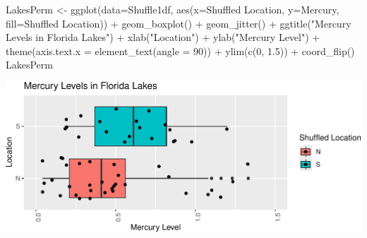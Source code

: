 \documentclass[
  letterpaper,
  DIV=11,
  numbers=noendperiod]{scrreprt}
\newenvironment{Shaded}{\begin{snugshade}}{\end{snugshade}}
\newcommand{\AttributeTok}[1]{\textcolor[rgb]{0.40,0.45,0.13}{#1}}
\newcommand{\DecValTok}[1]{\textcolor[rgb]{0.68,0.00,0.00}{#1}}
\newcommand{\FloatTok}[1]{\textcolor[rgb]{0.68,0.00,0.00}{#1}}
\newcommand{\FunctionTok}[1]{\textcolor[rgb]{0.28,0.35,0.67}{#1}}
\newcommand{\NormalTok}[1]{\textcolor[rgb]{0.00,0.23,0.31}{#1}}
\newcommand{\OtherTok}[1]{\textcolor[rgb]{0.00,0.23,0.31}{#1}}
\newcommand{\SpecialCharTok}[1]{\textcolor[rgb]{0.37,0.37,0.37}{#1}}
\newcommand{\StringTok}[1]{\textcolor[rgb]{0.13,0.47,0.30}{#1}}
\begin{document}
\begin{Shaded}
\end{Shaded}

\begin{Shaded}
\begin{Highlighting}[]
\NormalTok{LakesPerm }\OtherTok{\textless{}{-}} \FunctionTok{ggplot}\NormalTok{(}\AttributeTok{data=}\NormalTok{Shuffle1df, }\FunctionTok{aes}\NormalTok{(}\AttributeTok{x=}\StringTok{\textasciigrave{}}\AttributeTok{Shuffled Location}\StringTok{\textasciigrave{}}\NormalTok{, }\AttributeTok{y=}\NormalTok{Mercury, }\AttributeTok{fill=}\StringTok{\textasciigrave{}}\AttributeTok{Shuffled Location}\StringTok{\textasciigrave{}}\NormalTok{)) }\SpecialCharTok{+} 
  \FunctionTok{geom\_boxplot}\NormalTok{() }\SpecialCharTok{+}   \FunctionTok{geom\_jitter}\NormalTok{() }\SpecialCharTok{+} \FunctionTok{ggtitle}\NormalTok{(}\StringTok{"Mercury Levels in Florida Lakes"}\NormalTok{) }\SpecialCharTok{+} 
  \FunctionTok{xlab}\NormalTok{(}\StringTok{"Location"}\NormalTok{) }\SpecialCharTok{+} \FunctionTok{ylab}\NormalTok{(}\StringTok{"Mercury Level"}\NormalTok{) }\SpecialCharTok{+} \FunctionTok{theme}\NormalTok{(}\AttributeTok{axis.text.x =} \FunctionTok{element\_text}\NormalTok{(}\AttributeTok{angle =} \DecValTok{90}\NormalTok{)) }\SpecialCharTok{+} \FunctionTok{ylim}\NormalTok{(}\FunctionTok{c}\NormalTok{(}\DecValTok{0}\NormalTok{, }\FloatTok{1.5}\NormalTok{)) }\SpecialCharTok{+} \FunctionTok{coord\_flip}\NormalTok{()}
\NormalTok{LakesPerm}
\end{Highlighting}
\end{Shaded}

\includegraphics{Ch3_files/figure-pdf/unnamed-chunk-187-1.pdf}
\end{document}
